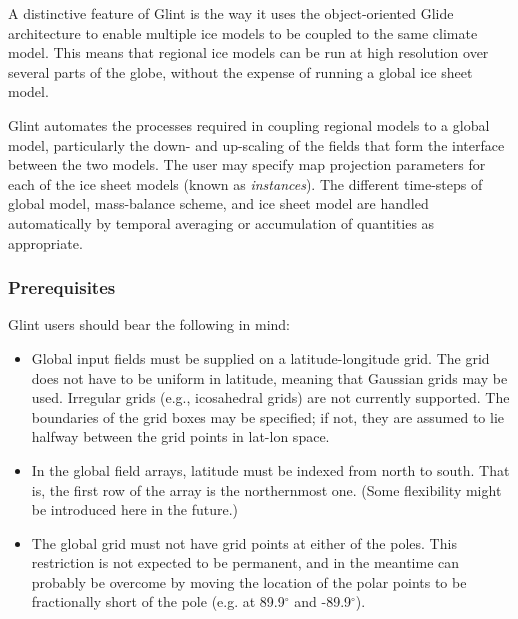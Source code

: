 A distinctive feature of Glint is the
way it uses the object-oriented Glide architecture to enable multiple ice
models to be coupled to the same climate model. This means that regional ice
models can be run at high resolution over several parts of the globe,
without the expense of running a global ice sheet model.

Glint automates the processes required in coupling regional models to a global
model, particularly the down- and up-scaling of the fields that form the
interface between the two models. The user may specify map projection
parameters for each of the ice sheet models (known as \emph{instances}).
The different time-steps of global model, mass-balance scheme, and ice sheet model are
handled automatically by temporal averaging or accumulation of quantities as
appropriate. 

%
%
\subsubsection{Prerequisites}
%
Glint users should bear the following in mind:
%
\begin{itemize}
\item Global input fields must be supplied on a latitude-longitude
  grid. The grid does not have to be uniform in latitude, meaning that
  Gaussian grids may be used. Irregular grids (e.g., icosahedral grids) are not
  currently supported. The boundaries of the grid boxes may be specified; if
  not, they are assumed to lie halfway between the grid points in lat-lon space.
\item In the global field arrays, latitude must be indexed from north to south.
  That is, the first row of the array is the northernmost one. (Some
  flexibility might be introduced here in the future.)
\item The global grid must not have grid points at either of the
  poles. This restriction is not expected to be permanent, and in the meantime
  can probably be overcome by moving the location of the polar points to be
  fractionally short of the pole (e.g. at 89.9$^{\circ}$ and -89.9$^{\circ}$).
\end{itemize}
%

